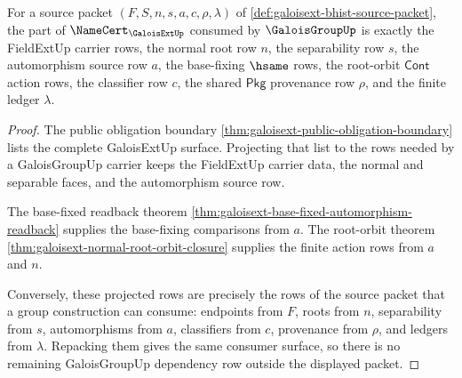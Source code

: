 \begin{theorem}
\label{thm:galoisext-galoisgroup-consumer-source-surface}
For a source packet $(F,S,n,s,a,c,\rho,\lambda)$ of
\autoref{def:galoisext-bhist-source-packet}, the part of
$\NameCert_{\GaloisExtUp}$ consumed by $\GaloisGroupUp$ is exactly the
FieldExtUp carrier rows, the normal root row $n$, the separability row $s$,
the automorphism source row $a$, the base-fixing $\hsame$ rows, the root-orbit
$\mathsf{Cont}$ action rows, the classifier row $c$, the shared
$\mathsf{Pkg}$ provenance row $\rho$, and the finite ledger $\lambda$.
\end{theorem}
\begin{proof}
The public obligation boundary
\autoref{thm:galoisext-public-obligation-boundary} lists the complete
GaloisExtUp surface. Projecting that list to the rows needed by a
GaloisGroupUp carrier keeps the FieldExtUp carrier data, the normal and
separable faces, and the automorphism source row.

The base-fixed readback theorem
\autoref{thm:galoisext-base-fixed-automorphism-readback} supplies the
base-fixing comparisons from $a$. The root-orbit theorem
\autoref{thm:galoisext-normal-root-orbit-closure} supplies the finite action
rows from $a$ and $n$.

Conversely, these projected rows are precisely the rows of the source packet
that a group construction can consume: endpoints from $F$, roots from $n$,
separability from $s$, automorphisms from $a$, classifiers from $c$,
provenance from $\rho$, and ledgers from $\lambda$. Repacking them gives the
same consumer surface, so there is no remaining GaloisGroupUp dependency row
outside the displayed packet.
\end{proof}

